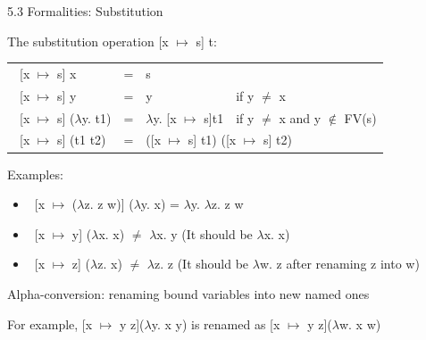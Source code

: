 \documentclass[table]{beamer}
\begin{document}
\begin{frame}[t]{5.3 Formalities: Substitution} \vspace{10pt}

The substitution operation [x $\mapsto$ s] t:

\begin{tabular}{l l l l}
\ [x $\mapsto$ s] x &=& s \\
\ [x $\mapsto$ s] y &=& y & if y $\not=$ x \\
\ [x $\mapsto$ s] ($\lambda$y. t1) &=& $\lambda$y. [x $\mapsto$ s]t1 & if y $\not=$ x and {\color{red}y $\not\in$ FV(s)} \\
\ [x $\mapsto$ s] (t1 t2) &=& \multicolumn{2}{l}{([x $\mapsto$ s] t1) ([x $\mapsto$ s] t2)} \\
\end{tabular}

\vspace{10pt}

Examples:
\begin{itemize}
\item \ 
[x $\mapsto$ ($\lambda$z. z w)] ($\lambda$y. x) = $\lambda$y. $\lambda$z. z w
\item \
[x $\mapsto$ y] ($\lambda$x. x) $\not=$ $\lambda$x. y  (It should be $\lambda$x. x)
\item \ 
[x $\mapsto$ z] ($\lambda$z. x) $\not=$ $\lambda$z. z  (It should be $\lambda$w. z after renaming z into w)
\end{itemize}

\vspace{10pt}

Alpha-conversion: renaming bound variables into new named ones

For example, [x $\mapsto$ y z]($\lambda${\color{red}y}. x {\color{red}y}) is renamed as [x $\mapsto$ y z]($\lambda${\color{red}w}. x {\color{red}w})
\end{frame}
\end{document}
